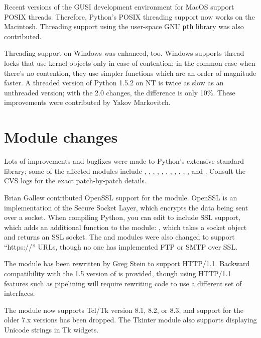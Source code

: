 \documentclass{howto}
\begin{document}
Recent versions of the GUSI development environment for MacOS support
POSIX threads.  Therefore, Python's POSIX threading support now works
on the Macintosh.  Threading support using the user-space GNU \texttt{pth}
library was also contributed.

Threading support on Windows was enhanced, too.  Windows supports
thread locks that use kernel objects only in case of contention; in
the common case when there's no contention, they use simpler functions
which are an order of magnitude faster.  A threaded version of Python
1.5.2 on NT is twice as slow as an unthreaded version; with the 2.0
changes, the difference is only 10\%.  These improvements were
contributed by Yakov Markovitch.

\section{Module changes}

Lots of improvements and bugfixes were made to Python's extensive
standard library; some of the affected modules include
, , ,
, , , ,
, , , ,
and .  Consult the CVS logs for the exact
patch-by-patch details.  

Brian Gallew contributed OpenSSL support for the 
module.  OpenSSL is an implementation of the Secure Socket Layer,
which encrypts the data being sent over a socket.  When compiling
Python, you can edit  to include SSL support,
which adds an additional function to the  module:
,
which takes a socket object and returns an SSL socket.  The
 and  modules were also changed to
support ``https://'' URLs, though no one has implemented FTP or SMTP
over SSL.  

The  module has been rewritten by Greg Stein to
support HTTP/1.1.  Backward compatibility with the 1.5 version of
 is provided, though using HTTP/1.1 features such as
pipelining will require rewriting code to use a different set of
interfaces.

The  module now supports Tcl/Tk version 8.1, 8.2, or
8.3, and support for the older 7.x versions has been dropped.  The
Tkinter module also supports displaying Unicode strings in Tk
widgets.  
\end{document}

